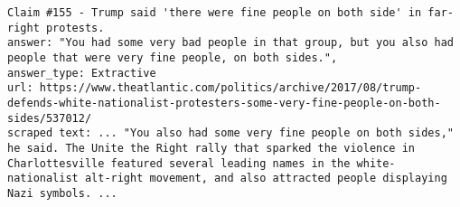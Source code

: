 \documentclass[oneside]{ctuthesis}
\theoremstyle{plain}
\theoremstyle{definition}
\theoremstyle{note}
\begin{document}
\begin{lstlisting}[caption={Example of a claim where our pipeline did not exactly extract the answer.}, label={lst:extractive_error}, breaklines=true, breakatwhitespace=false, columns=fullflexible]
Claim #155 - Trump said 'there were fine people on both side' in far-right protests.
answer: "You had some very bad people in that group, but you also had people that were very fine people, on both sides.", 
answer_type: Extractive
url: https://www.theatlantic.com/politics/archive/2017/08/trump-defends-white-nationalist-protesters-some-very-fine-people-on-both-sides/537012/
scraped text: ... "You also had some very fine people on both sides," he said. The Unite the Right rally that sparked the violence in Charlottesville featured several leading names in the white-nationalist alt-right movement, and also attracted people displaying Nazi symbols. ...
\end{lstlisting}
\end{document}
